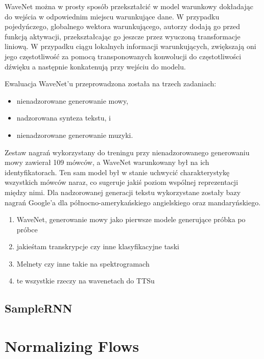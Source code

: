 \documentclass[magisterska]{pracamgr}
\renewcommand{\cite}{\citep}
\begin{document}
WaveNet można w prosty sposób przekształcić w model warunkowy dokładając do wejścia w odpowiednim miejscu warunkujące dane. W przypadku pojedyńczego, globalnego wektora warunkującego, autorzy dodają go przed funkcją aktywacji, przekształcając go jeszcze przez wyuczoną transformacje liniową. W przypadku ciągu lokalnych informacji warunkujących, zwiększają oni jego częstotliwość za pomocą transponowanych konwolucji do częstotliwości dźwięku a następnie konkatenują przy wejściu do modelu.

Ewaluacja WaveNet'u przeprowadzona została na trzech zadaniach:
\begin{itemize}
    \setlength\itemsep{0em}
    \item nienadzorowane generowanie mowy,
    \item nadzorowana synteza tekstu, i
    \item nienadzorowane generowanie muzyki.
\end{itemize}
Zestaw nagrań wykorzystany do treningu przy nienadzorowanego generowaniu mowy \cite{Veaux2017CSTRVC} zawierał 109 mówców, a WaveNet warunkowany był na ich identyfikatorach. Ten sam model był w stanie uchwycić charakterystykę wszystkich mówców naraz, co sugeruje jakiś poziom wspólnej reprezentacji między nimi. Dla nadzorowanej generacji tekstu wykorzystane zostały bazy nagrań Google'a dla północno-amerykańskiego angielskiego oraz mandaryńskiego.

\begin{enumerate}
    \setlength\itemsep{0em}
    \item WaveNet, generowanie mowy jako pierwsze modele generujące próbka po próbce
    \item jakieśtam transkrypcje czy inne klasyfikacyjne taski
    \item Melnety czy inne takie na spektrogramach
    \item te wszystkie rzeczy na wavenetach do TTSu
\end{enumerate}

\subsection{SampleRNN}

\subsection{}

\section{Normalizing Flows}
\end{document}
